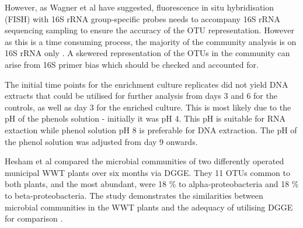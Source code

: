 \documentclass[11pt]{article}
\begin{document}
However, as Wagner et al have suggested, fluorescence in situ hybridisation (FISH) with 16S rRNA  group-specific probes needs to accompany 16S rRNA sequencing sampling to ensure the accuracy of the OTU representation. However as this is a time consuming process, the majority of the community analysis is on 16S rRNA only \cite{Wagner_02} . A skewered representation of the OTUs in the community can arise from 16S primer bias which should be checked and accounted for.

The initial time points for the enrichment culture replicates did not yield DNA extracts that could be utilised for further analysis from days 3 and 6 for the controls, as well as day 3 for the enriched culture. This is most likely due to the pH of the phenols solution - initially it was pH 4. This pH is suitable for RNA extaction while phenol solution pH 8 is preferable for DNA extraction. The pH of the phenol solution was adjusted from day 9 onwards.

Hesham et al compared the microbial communities of two differently operated municipal WWT plants over six months via DGGE. They 11 OTUs common to both plants, and the most abundant, were 18 \% to alpha-proteobacteria and 18 \% to beta-proteobacteria. The study demonstrates the similarities between microbial communities in the WWT plants and the adequacy of utilising DGGE for comparison \cite{Hesham_11}.
\end{document}
